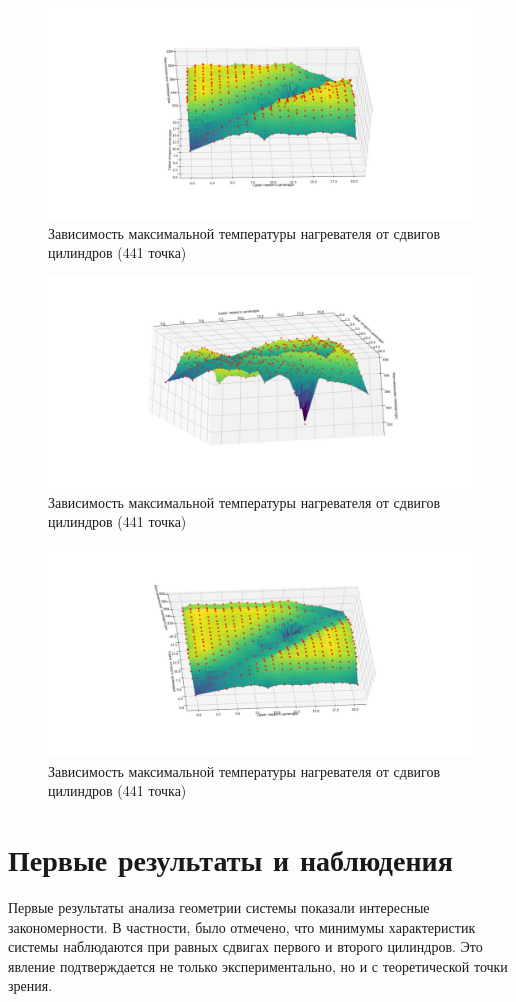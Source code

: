 \documentclass[a4paper,12pt]{article}
\theoremstyle{plain} %
\theoremstyle{definition} %
\theoremstyle{remark} %
\begin{document}
\begin{figure}[h]
	\begin{center}
		\includegraphics[width=0.4\linewidth]{18.1.jpg}
		\caption{Зависимость максимальной температуры нагревателя от сдвигов цилиндров (441 точка)} %
	\end{center}
\end{figure}
\begin{figure}[h]
	\begin{center}
		\includegraphics[width=0.4\linewidth]{18.2.jpg}
		\caption{Зависимость максимальной температуры нагревателя от сдвигов цилиндров (441 точка)} %
	\end{center}
\end{figure}
\begin{figure}[h]
	\begin{center}
		\includegraphics[width=0.4\linewidth]{18.3.jpg}
		\caption{Зависимость максимальной температуры нагревателя от сдвигов цилиндров (441 точка)} %
	\end{center}
\end{figure}

\section{Первые результаты и наблюдения}

Первые результаты анализа геометрии системы показали интересные закономерности. В частности, было отмечено, что минимумы характеристик системы наблюдаются при равных сдвигах первого и второго цилиндров. Это явление подтверждается не только экспериментально, но и с теоретической точки зрения.
\end{document}
